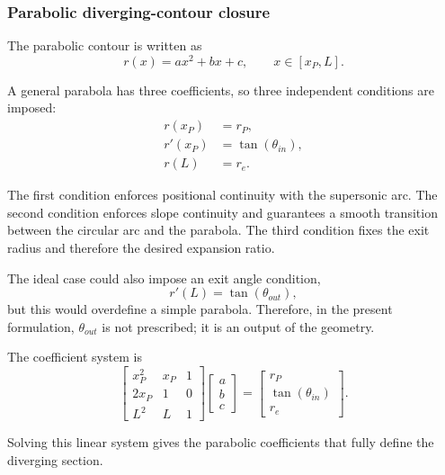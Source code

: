 \subsubsection{Parabolic diverging-contour closure}

The parabolic contour is written as
\begin{equation}
r(x)=ax^2+bx+c,\qquad x\in[x_P,L].
\label{eq:parabola}
\end{equation}

A general parabola has three coefficients, so three independent conditions are imposed:
\begin{align}
r(x_P)&=r_P,
\label{eq:par_cond1}\\
r'(x_P)&=\tan(\theta_{in}),
\label{eq:par_cond2}\\
r(L)&=r_e.
\label{eq:par_cond3}
\end{align}

The first condition enforces positional continuity with the supersonic arc. The second condition enforces slope continuity and guarantees a smooth transition between the circular arc and the parabola. The third condition fixes the exit radius and therefore the desired expansion ratio.

The ideal case could also impose an exit angle condition,
\begin{equation}
r'(L)=\tan(\theta_{out}),
\end{equation}
but this would overdefine a simple parabola. Therefore, in the present formulation, $\theta_{out}$ is not prescribed; it is an output of the geometry.

The coefficient system is
\begin{equation}
\begin{bmatrix}
x_P^2 & x_P & 1\\
2x_P & 1 & 0\\
L^2 & L & 1
\end{bmatrix}
\begin{bmatrix}
a\\b\\c
\end{bmatrix}
=
\begin{bmatrix}
r_P\\ \tan(\theta_{in})\\ r_e
\end{bmatrix}.
\label{eq:parabola_matrix}
\end{equation}

Solving this linear system gives the parabolic coefficients that fully define the diverging section.

